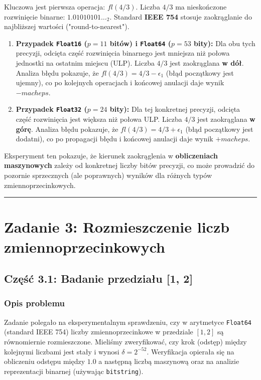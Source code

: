 \documentclass[11pt, a4paper]{article}
\newcommand{\taskseparator}{\leavevmode\leaders\hrule height 0.5pt\hfill\kern0pt}
\begin{document}
Kluczowa jest pierwsza operacja: $fl(4/3)$. Liczba $4/3$ ma nieskończone rozwinięcie binarne: $1.01010101\dots_2$. Standard \textbf{IEEE 754} stosuje zaokrąglanie do najbliższej wartości ("round-to-nearest").

\begin{enumerate}
    \item \textbf{Przypadek \texttt{Float16} ($p=11$ bitów) i \texttt{Float64} ($p=53$ bity):}
    Dla obu tych precyzji, odcięta część rozwinięcia binarnego jest mniejsza niż połowa jednostki na ostatnim miejscu (ULP). Liczba $4/3$ jest zaokrąglana \textbf{w dół}. 
    Analiza błędu pokazuje, że $fl(4/3) = 4/3 - \epsilon_1$ (błąd początkowy jest ujemny), co po kolejnych operacjach i końcowej anulacji daje wynik $-macheps$.

    \item \textbf{Przypadek \texttt{Float32} ($p=24$ bity):}
    Dla tej konkretnej precyzji, odcięta część rozwinięcia jest większa niż połowa ULP. Liczba $4/3$ jest zaokrąglana \textbf{w górę}.
    Analiza błędu pokazuje, że $fl(4/3) = 4/3 + \epsilon_1$ (błąd początkowy jest dodatni), co po propagacji błędu i końcowej anulacji daje wynik $+macheps$.
\end{enumerate}

Eksperyment ten pokazuje, że kierunek zaokrąglenia w \textbf{obliczeniach maszynowych} zależy od konkretnej liczby bitów precyzji, co może prowadzić do pozornie sprzecznych (ale poprawnych) wyników dla różnych typów zmiennoprzecinkowych.

\taskseparator

\section{Zadanie 3: Rozmieszczenie liczb zmiennoprzecinkowych}

\subsection{Część 3.1: Badanie przedziału [1, 2]}

\subsubsection{Opis problemu}
Zadanie polegało na eksperymentalnym sprawdzeniu, czy w arytmetyce \texttt{Float64} (standard IEEE 754) liczby zmiennoprzecinkowe w przedziale $[1, 2]$ są równomiernie rozmieszczone. Mieliśmy zweryfikować, czy krok (odstęp) między kolejnymi liczbami jest stały i wynosi $\delta = 2^{-52}$. Weryfikacja opierała się na obliczeniu odstępu między $1.0$ a następną liczbą maszynową oraz na analizie reprezentacji binarnej (używając \texttt{bitstring}).
\end{document}
